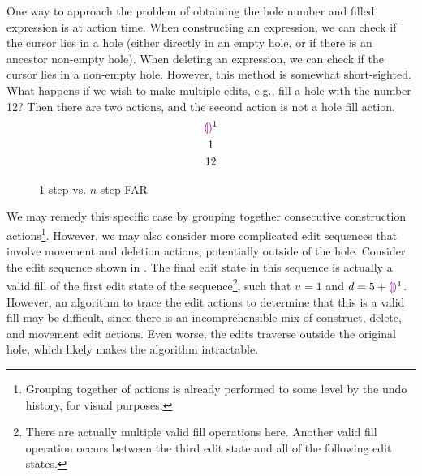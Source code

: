 One way to approach the problem of obtaining the hole number and filled expression is at action time. When constructing an expression, we can check if the cursor lies in a hole (either directly in an empty hole, or if there is an ancestor non-empty hole). When deleting an expression, we can check if the cursor lies in a non-empty hole. However, this method is somewhat short-sighted. What happens if we wish to make multiple edits, e.g., fill a hole with the number 12? Then there are two actions, and the second action is not a hole fill action.
\begin{gather*}
  \textcolor{violet}{\llparenthesis}\textcolor{violet}{\rrparenthesis}^1 \\
  1 \\
  12
\end{gather*}

\begin{figure}
  \centering
  
  \caption{1-step vs. $n$-step FAR}
  \label{fig:one-step-vs-n-step-far}
\end{figure}

We may remedy this specific case by grouping together consecutive construction actions\footnote{Grouping together of actions is already performed to some level by the undo history, for visual purposes.}. However, we may also consider more complicated edit sequences that involve movement and deletion actions, potentially outside of the hole. Consider the edit sequence shown in . The final edit state in this sequence is actually a valid fill of the first edit state of the sequence\footnote{There are actually multiple valid fill operations here. Another valid fill operation occurs between the third edit state and all of the following edit states.}, such that $u=1$ and $d=5+\textcolor{violet}{\llparenthesis}\textcolor{violet}{\rrparenthesis}^1$. However, an algorithm to trace the edit actions to determine that this is a valid fill may be difficult, since there is an incomprehensible mix of construct, delete, and movement edit actions. Even worse, the edits traverse outside the original hole, which likely makes the algorithm intractable.

